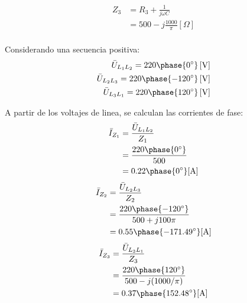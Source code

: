 \documentclass[letter,11pt]{article}
\begin{document}
\begin{equation*}
    \begin{split}
        Z_3 &= R_3+\frac{1}{j\omega C}\\
            &= 500-j\frac{1000}{\pi}[\Omega]\\
    \end{split}
\end{equation*}

Considerando una secuencia positiva:
\begin{equation*}
    \begin{split}
        \bar{U}_{L_1L_2} = 220\phase{0^{\circ}}\,[\text{V}]\\
        \bar{U}_{L_2L_3} = 220\phase{-120^{\circ}}\,[\text{V}]\\
        \bar{U}_{L_3L_1} = 220\phase{120^{\circ}}\,[\text{V}]\\
    \end{split}
\end{equation*}

A partir de los voltajes de linea, se calculan las corrientes de fase:
\begin{equation*}
    \begin{split}
        \bar{I}_{Z_1} &= \frac{\bar{U}_{L_1L_2}}{Z_1}\\
                      &= \frac{220\phase{0^{\circ}}}{500}\\
                      &= 0.22\phase{0^{\circ}}[\text{A}]\\
    \end{split}
\end{equation*}
\begin{equation*}
    \begin{split}
        \bar{I}_{Z_2} &= \frac{\bar{U}_{L_2L_3}}{Z_2}\\
                      &= \frac{220\phase{-120^{\circ}}}{500+j100\pi}\\
                      &= 0.55\phase{-171.49^{\circ}}[\text{A}]\\
    \end{split}
\end{equation*}
\begin{equation*}
    \begin{split}
        \bar{I}_{Z_3} &= \frac{\bar{U}_{L_3L_1}}{Z_3}\\
                      &= \frac{220\phase{120^{\circ}}}{500-j(1000/\pi)}\\
                      &= 0.37\phase{152.48^{\circ}}[\text{A}]\\
    \end{split}
\end{equation*}
\end{document}
